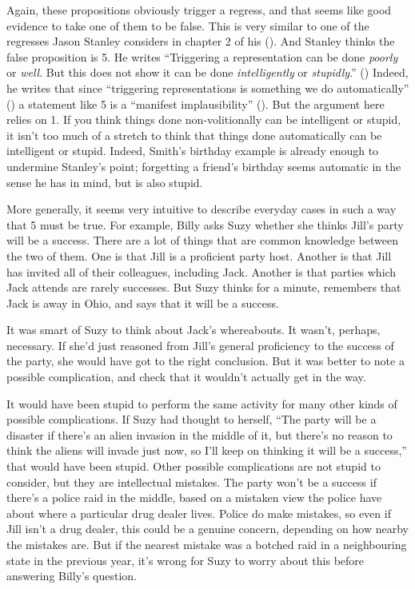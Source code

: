 \documentclass[
  11pt,
  letterpaper,
  DIV=11,
  numbers=noendperiod,
  twoside]{scrartcl}
\begin{document}
Again, these propositions obviously trigger a regress, and that seems
like good evidence to take one of them to be false. This is very similar
to one of the regresses Jason Stanley considers in chapter 2 of his
(). And Stanley thinks the false
proposition is 5. He writes ``Triggering a representation can be done
\emph{poorly} or \emph{well}. But this does not show it can be done
\emph{intelligently} or \emph{stupidly}.''
() Indeed, he writes that
since ``triggering representations is something we do automatically''
() a statement like 5 is a
``manifest implausibility'' (). But the argument here relies on 1. If you think things done
non-volitionally can be intelligent or stupid, it isn't too much of a
stretch to think that things done automatically can be intelligent or
stupid. Indeed, Smith's birthday example is already enough to undermine
Stanley's point; forgetting a friend's birthday seems automatic in the
sense he has in mind, but is also stupid.

More generally, it seems very intuitive to describe everyday cases in
such a way that 5 must be true. For example, Billy asks Suzy whether she
thinks Jill's party will be a success. There are a lot of things that
are common knowledge between the two of them. One is that Jill is a
proficient party host. Another is that Jill has invited all of their
colleagues, including Jack. Another is that parties which Jack attends
are rarely successes. But Suzy thinks for a minute, remembers that Jack
is away in Ohio, and says that it will be a success.

It was smart of Suzy to think about Jack's whereabouts. It wasn't,
perhaps, necessary. If she'd just reasoned from Jill's general
proficiency to the success of the party, she would have got to the right
conclusion. But it was better to note a possible complication, and check
that it wouldn't actually get in the way.

It would have been stupid to perform the same activity for many other
kinds of possible complications. If Suzy had thought to herself, ``The
party will be a disaster if there's an alien invasion in the middle of
it, but there's no reason to think the aliens will invade just now, so
I'll keep on thinking it will be a success,'' that would have been
stupid. Other possible complications are not stupid to consider, but
they are intellectual mistakes. The party won't be a success if there's
a police raid in the middle, based on a mistaken view the police have
about where a particular drug dealer lives. Police do make mistakes, so
even if Jill isn't a drug dealer, this could be a genuine concern,
depending on how nearby the mistakes are. But if the nearest mistake was
a botched raid in a neighbouring state in the previous year, it's wrong
for Suzy to worry about this before answering Billy's question.
\end{document}
